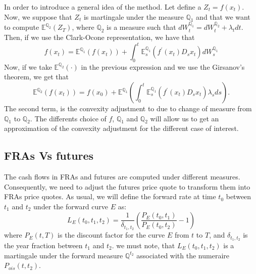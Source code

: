 \documentclass[a4paper,10pt]{article}
\newcommand{\1}{\mathbf{1}}
\begin{document}
In order to introduce a general idea of the method. Let define a $Z_t = f(x_t)$. Now, we suppose that $Z_t$ is martingale under the measure $\mathbb{Q}_1$ and that we want to compute $\mathbb{E}^{\mathbb{Q}_2}\left(Z_T \right)$, where $\mathbb{Q}_2$ is a measure such that $dW^{\mathbb{Q}_1}_t = dW^{\mathbb{Q}_2}_t +\lambda_t dt$. Then, if we use the Clark-Ocone representation, we have that
\begin{equation*}
f(x_t) = \mathbb{E}^{\mathbb{Q}_1}\left(f(x_t)\right) + \int_{0}^{t} \mathbb{E}^{\mathbb{Q}_1}_s\left( f^{\prime}(x_t) D_s x_t  \right) dW^{\mathbb{Q}_1}_s
\end{equation*}
Now, if we take $\mathbb{E}^{\mathbb{Q}_2}\left( \cdot \right)$ in the previous expression and we use the Girsanov's theorem, we get that
\begin{equation}\label{general_convexity}
\mathbb{E}^{\mathbb{Q}_2}\left( f(x_t) \right) = f(x_0) + \mathbb{E}^{\mathbb{Q}_1} \left(\int_{0}^{t}  \mathbb{E}^{\mathbb{Q}_1}_s\left( f^{\prime}(x_t) D_s x_t  \right) \lambda_s ds \right). 
\end{equation}
The second term, is the convexity adjustment to due to change of measure from $\mathbb{Q}_1$ to $\mathbb{Q}_2$. The differents choice of $f$, $\mathbb{Q}_1$ and $\mathbb{Q}_2$ will allow us to get an approximation of the convexity adjustment for the different case of interest. 
\subsection{FRAs Vs futures}
 The cash flows in FRAs and futures are computed under different measures. Consequently, we need to adjust the futures price quote to transform them into FRAs price quotes. As usual, we will define the forward rate at time $t_0$ between $t_1$ and $t_2$ under the forward curve $E$ as:
\begin{equation}\label{forward_rate}
L_{E}(t_0, t_1, t_2) = \frac{1}{\delta_{t_1,t_2}}\left(\frac{P_{E}(t_0,t_1)}{P_{E}(t_0,t_2)} - 1 \right)
\end{equation} 
where $P_{E}(t,T)$ is the discount factor for the curve $E$ from $t$ to $T$, and $\delta_{t_1,t_2}$ is the year fraction between $t_1$ and $t_2$. we must note, that $L_{E}(t_0, t_1, t_2)$ is a martingale under the forward measure $\mathbb{Q}^{t_2}$ associated with the numeraire $P_{ois}(t,t_2)$.
\end{document}
